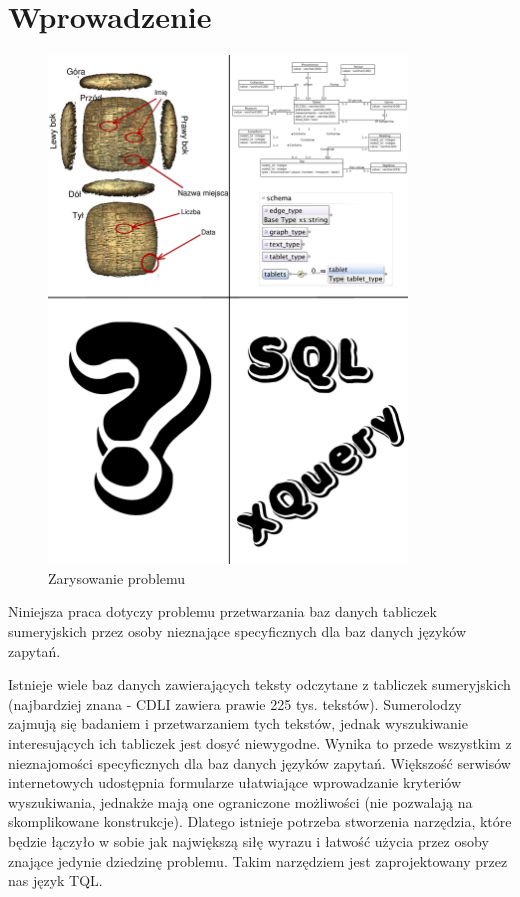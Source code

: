 \chapter*{Wprowadzenie}
\begin{figure}
 \centering
\includegraphics[width=360px]{./diagramy/poco.pdf}
 \caption{Zarysowanie problemu}
\end{figure}

 
 
Niniejsza praca dotyczy problemu przetwarzania baz danych tabliczek sumeryjskich przez osoby nieznające specyficznych dla baz danych języków zapytań.


Istnieje wiele baz danych zawierających teksty odczytane z tabliczek sumeryjskich (najbardziej znana - CDLI zawiera prawie 225 tys. tekstów). Sumerolodzy zajmują się badaniem i przetwarzaniem tych tekstów, jednak wyszukiwanie interesujących ich tabliczek jest dosyć niewygodne. Wynika to przede wszystkim z nieznajomości specyficznych dla baz danych języków zapytań. 
Większość serwisów internetowych udostępnia formularze ułatwiające wprowadzanie kryteriów wyszukiwania, jednakże mają one ograniczone możliwości (nie pozwalają na skomplikowane konstrukcje). Dlatego istnieje potrzeba stworzenia narzędzia, które będzie łączyło w sobie jak największą siłę wyrazu i łatwość użycia przez osoby znające jedynie dziedzinę problemu. Takim narzędziem jest zaprojektowany przez nas język TQL. 

